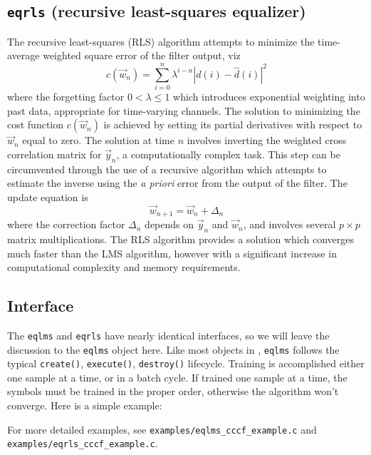 \subsection{{\tt eqrls} (recursive least-squares equalizer)}
\label{module:equalization:eqrls}
The recursive least-squares (RLS) algorithm attempts to minimize the
time-average weighted square error of the filter output, viz
\begin{equation}
c(\vec{w}_n) = \sum\limits_{i=0}^{n}{ \lambda^{i-n} \left| d(i)-\hat{d}(i)\right|^2 }
\end{equation}
where the forgetting factor $0<\lambda\leq 1$ which introduces
exponential weighting into past data, appropriate for time-varying
channels.
The solution to minimizing the cost function $c(\vec{w}_n)$ is achieved by
setting its partial derivatives with respect to $\vec{w}_n$ equal to zero.
The solution at time $n$ involves inverting the weighted cross correlation
matrix for $\vec{y}_n$, a computationally complex task.
This step can be circumvented through the use of a recursive algorithm which
attempts to estimate the inverse using the {\it a priori} error from the
output of the filter.
The update equation is
\begin{equation}
\label{eq:rls:weight_update}
\vec{w}_{n+1} = \vec{w}_n + \Delta_{n}
\end{equation}
where the correction factor $\Delta_{n}$ depends on $\vec{y}_n$ and $\vec{w}_n$,
and involves several $p \times p$ matrix multiplications.
The RLS algorithm provides a solution which converges much faster than the LMS
algorithm, however with a significant increase in computational complexity and
memory requirements.

\subsection{Interface}
\label{module:equalization:interface}
The {\tt eqlms} and {\tt eqrls} have nearly identical interfaces, so we will
leave the discussion to the {\tt eqlms} object here.
Like most objects in \liquid, {\tt eqlms} follows the typical
{\tt create()}, {\tt execute()}, {\tt destroy()} lifecycle.
Training is accomplished either one sample at a time, or in a batch cycle.
If trained one sample at a time, the symbols must be trained in the proper
order, otherwise the algorithm won't converge.
Here is a simple example:
%

%
For more detailed examples, see
{\tt examples/eqlms\_cccf\_example.c} and
{\tt examples/eqrls\_cccf\_example.c}.

